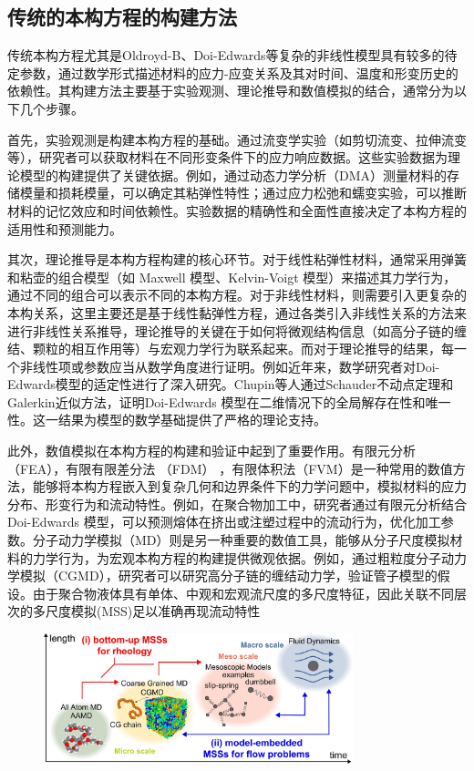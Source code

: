 \subsection{传统的本构方程的构建方法}
传统本构方程尤其是Oldroyd-B、Doi-Edwards等复杂的非线性模型具有较多的待定参数，通过数学形式描述材料的应力-应变关系及其对时间、温度和形变历史的依赖性。其构建方法主要基于实验观测、理论推导和数值模拟的结合，通常分为以下几个步骤。

首先，实验观测是构建本构方程的基础。通过流变学实验（如剪切流变、拉伸流变等），研究者可以获取材料在不同形变条件下的应力响应数据。这些实验数据为理论模型的构建提供了关键依据。例如，通过动态力学分析（DMA）测量材料的存储模量和损耗模量，可以确定其粘弹性特性；通过应力松弛和蠕变实验，可以推断材料的记忆效应和时间依赖性。实验数据的精确性和全面性直接决定了本构方程的适用性和预测能力。

其次，理论推导是本构方程构建的核心环节。对于线性粘弹性材料，通常采用弹簧和粘壶的组合模型（如 Maxwell 模型、Kelvin-Voigt 模型）来描述其力学行为，通过不同的组合可以表示不同的本构方程。对于非线性材料，则需要引入更复杂的本构关系，这里主要还是基于线性黏弹性方程，通过各类引入非线性关系的方法来进行非线性关系推导，理论推导的关键在于如何将微观结构信息（如高分子链的缠结、颗粒的相互作用等）与宏观力学行为联系起来。而对于理论推导的结果，每一个非线性项或参数应当从数学角度进行证明。例如近年来，数学研究者对Doi-Edwards模型的适定性进行了深入研究。Chupin等人通过Schauder不动点定理和Galerkin近似方法，证明Doi-Edwards 模型在二维情况下的全局解存在性和唯一性。这一结果为模型的数学基础提供了严格的理论支持。

此外，数值模拟在本构方程的构建和验证中起到了重要作用。有限元分析（FEA），有限有限差分法 （FDM） ，有限体积法（FVM）是一种常用的数值方法，能够将本构方程嵌入到复杂几何和边界条件下的力学问题中，模拟材料的应力分布、形变行为和流动特性。例如，在聚合物加工中，研究者通过有限元分析结合 Doi-Edwards 模型，可以预测熔体在挤出或注塑过程中的流动行为，优化加工参数。分子动力学模拟（MD）则是另一种重要的数值工具，能够从分子尺度模拟材料的力学行为，为宏观本构方程的构建提供微观依据。例如，通过粗粒度分子动力学模拟（CGMD），研究者可以研究高分子链的缠结动力学，验证管子模型的假设。由于聚合物液体具有单体、中观和宏观流尺度的多尺度特征，因此关联不同层次的多尺度模拟(MSS)足以准确再现流动特性
\begin{figure}[htbp]
	\centering
	\includegraphics[width=0.8\textwidth]{Fig/duochidumoni.png}
\end{figure}

